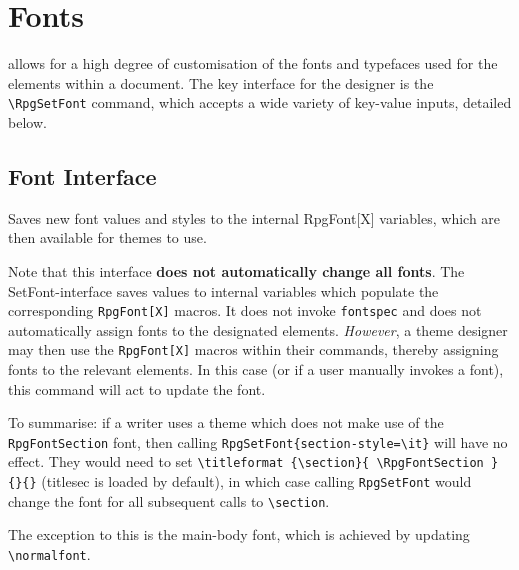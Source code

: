\chapter{Fonts}

	\rpgtex{} allows for a high degree of customisation of the fonts and typefaces used for the elements within a document. The key interface for the designer is the \verb|\RpgSetFont| command, which accepts a wide variety of key-value inputs, detailed below. 

	
	\section{Font Interface}\label{S:FontInterface}

		\begin{macrolist}
			{
				Saves new font values and styles to the internal RpgFont[X] variables, which are then available for themes to use.			
			}
			{
			}{
				Note that this interface \textbf{does not automatically change all fonts}. The SetFont-interface saves values to internal variables which populate the corresponding \verb|RpgFont[X]| macros. It does not invoke \verb|fontspec| and does not automatically assign fonts to the designated elements. \textit{However}, a theme designer may then use the \verb|RpgFont[X]| macros within their commands, thereby assigning fonts to the relevant elements. In this case (or if a user manually invokes a font), this command will act to update the font.

				To summarise: if a writer uses a theme which does not make use of the \verb|RpgFontSection| font, then calling \verb|RpgSetFont{section-style=\it}| will have no effect. They would need to set \verb|\titleformat {\section}{ \RpgFontSection }{}{}| (titlesec is loaded by default), in which case calling \verb|RpgSetFont| would change the font for all subsequent calls to \verb|\section|.
				
				The exception to this is the main-body font, which is achieved by updating \verb|\normalfont|. 
			}
		\end{macrolist}


